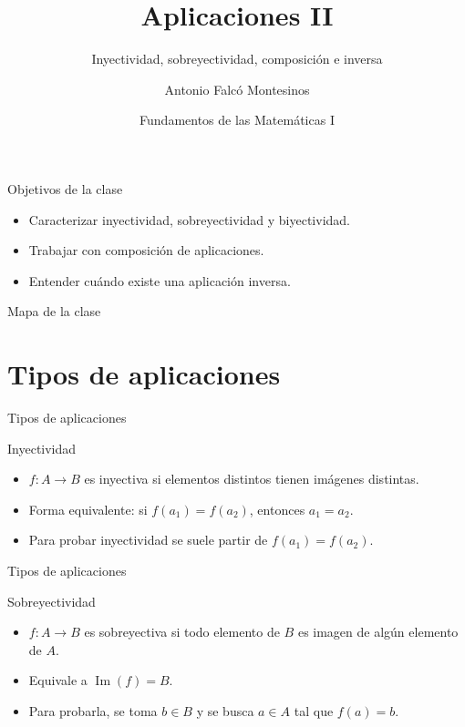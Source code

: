 \documentclass[aspectratio=169,11pt]{beamer}
\title[FdM I -- Clase 09]{Aplicaciones II}
\subtitle{Inyectividad, sobreyectividad, composición e inversa}
\author{Antonio Falcó Montesinos}
\institute{Universidad CEU Cardenal Herrera}
\date{Fundamentos de las Matemáticas I}
\begin{document}
\begin{frame}
  \titlepage
\end{frame}

\begin{frame}{Objetivos de la clase}
\begin{itemize}
  \item Caracterizar inyectividad, sobreyectividad y biyectividad.
  \item Trabajar con composición de aplicaciones.
  \item Entender cuándo existe una aplicación inversa.
\end{itemize}
\end{frame}

\begin{frame}{Mapa de la clase}
\tableofcontents
\end{frame}

\section{Tipos de aplicaciones}

\begin{frame}{Tipos de aplicaciones}
\begin{block}{Inyectividad}
\begin{itemize}
  \item \(f:A\to B\) es inyectiva si elementos distintos tienen imágenes distintas.
  \item Forma equivalente: si \(f(a_1)=f(a_2)\), entonces \(a_1=a_2\).
  \item Para probar inyectividad se suele partir de \(f(a_1)=f(a_2)\).
\end{itemize}
\end{block}
\end{frame}

\begin{frame}{Tipos de aplicaciones}
\begin{block}{Sobreyectividad}
\begin{itemize}
  \item \(f:A\to B\) es sobreyectiva si todo elemento de \(B\) es imagen de algún elemento de \(A\).
  \item Equivale a \(\operatorname{Im}(f)=B\).
  \item Para probarla, se toma \(b\in B\) y se busca \(a\in A\) tal que \(f(a)=b\).
\end{itemize}
\end{block}
\end{frame}
\end{document}
